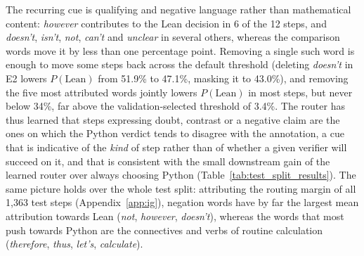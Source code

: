 The recurring cue is qualifying and negative language rather than mathematical content: \emph{however} contributes to the Lean decision in 6 of the 12 steps, and \emph{doesn't}, \emph{isn't}, \emph{not}, \emph{can't} and \emph{unclear} in several others, whereas the comparison words move it by less than one percentage point. Removing a single such word is enough to move some steps back across the default threshold (deleting \emph{doesn't} in E2 lowers $P(\mathrm{Lean})$ from 51.9\% to 47.1\%, masking it to 43.0\%), and removing the five most attributed words jointly lowers $P(\mathrm{Lean})$ in most steps, but never below 34\%, far above the validation-selected threshold of 3.4\%. The router has thus learned that steps expressing doubt, contrast or a negative claim are the ones on which the Python verdict tends to disagree with the annotation, a cue that is indicative of the \emph{kind} of step rather than of whether a given verifier will succeed on it, and that is consistent with the small downstream gain of the learned router over always choosing Python (Table~\ref{tab:test_split_results}). The same picture holds over the whole test split: attributing the routing margin of all 1,363 test steps (Appendix~\ref{app:ig}), negation words have by far the largest mean attribution towards Lean (\emph{not}, \emph{however}, \emph{doesn't}), whereas the words that most push towards Python are the connectives and verbs of routine calculation (\emph{therefore}, \emph{thus}, \emph{let's}, \emph{calculate}).
